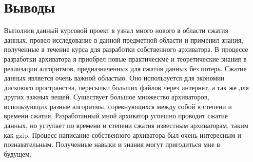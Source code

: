 \documentclass[14pt]{article}
\begin{document}
\pagebreak

\section*{Выводы}

Выполнив данный курсовой проект я узнал много нового в области сжатия данных, провел исследование в данной предметной области и применил знания, полученные в течение курса для разработки собственного архиватора. В процессе разработки архиватора я приобрел новые практическме и теоретические знания в реализации алгоритмов, предназначенных для сжатия данных без потерь. Сжатие данных является очень важной областью. Оно используется для экономии дискового пространства, пересылки больших файлов через интернет, а так же для других важных вещей. Существует большое множество архиваторов, использующих разные алгоритмы, соревнующихся между собой в степени и времени сжатия. Разработанный мной архиватор успешно проводит сжатие данных, но уступает по времени и степени сжатия известным архиваторам, таким как gzip. Процесс написание собственного архиватора был очень интересным и познавательным. Полученные навыки и знания могут пригодиться мне в будущем. 
\end{document}
